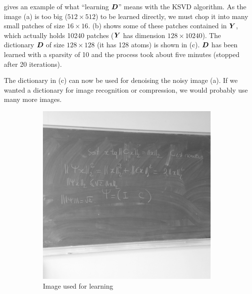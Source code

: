  gives an example of what “learning $\bm{D}$” means with the \ac{KSVD} algorithm. As the image (a) is too big ($512 \times 512$) to be learned directly, we must chop it into many small patches of size $16 \times 16$. (b) shows some of these patches contained in $\bm{Y}$, which actually holds 10240 patches ($\bm{Y}$ has dimension $128 \times 10240$). The dictionary $\bm{D}$ of size $128 \times 128$ (it has 128 atoms) is shown in (c). $\bm{D}$ has been learned with a sparsity of 10 and the process took about five minutes (stopped after 20 iterations).

The dictionary in (c) can now be used for denoising the noisy image (a). If we wanted a dictionary for image recognition or compression, we would probably use many more images.

\begin{figure}[!ht]\centering
\begin{subfigure}[b]{0.40\textwidth}\centering
	\includegraphics[width=\textwidth]{figures/ksvd/tableau_512x512.png}
	\caption{Image used for learning}
\end{subfigure}
\begin{subfigure}[b]{0.29\textwidth}\centering

\end{subfigure}
\end{figure}
